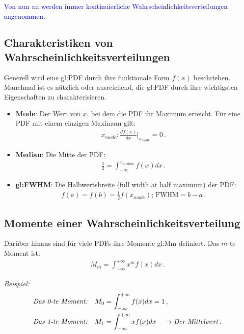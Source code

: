 \begin{center}
\textcolor{blue}{Von nun an werden immer kontinuierliche Wahrscheinlichkeitsverteilungen angenommen.}
\end{center}


\subsection{Charakteristiken von Wahrscheinlichkeitsverteilungen}
\label{subsec:vl4-5}

Generell wird eine \gls{gl:PDF} durch ihre funktionale Form $f ( x )$ beschrieben. Manchmal ist es n\"utzlich oder ausreichend, die \gls{gl:PDF} durch ihre wichtigsten Eigenschaften zu charakterisieren.
\begin{itemize}
    \setlength\itemsep{0em}
        \item \textbf{Mode}: Der Wert von $x$, bei dem die PDF ihr Maximum erreicht. F\"ur eine PDF mit einem einzigen Maximum gilt: 
        \begin{align}
        x_{mode}: \frac{d f ( x )}{dx} \bigg|_{x_{mode}} = 0\,.
        \label{eq:vl4-17}
        \end{align}
        \item \textbf{Median}: Die Mitte der PDF:
        \begin{align}
        \frac{1}{2} = \int_{-\infty}^{x_{median}} f ( x ) dx\,.
        \label{eq:vl4-18}
        \end{align}
        \item \textbf{\gls{gl:FWHM}}: Die Halbwertsbreite (full width at half maximum) der PDF:
        \begin{align}
        f ( a ) = f ( b ) = \frac{1}{2} f ( x_{mode} ) \text{; FWHM} = b - a\,.
        \label{eq:vl4-19}
        \end{align}
\end{itemize}


\subsection{Momente einer Wahrscheinlichkeitsverteilung}
\label{subsec:vl4-6}

Dar\"uber hinaus sind f\"ur viele PDFs ihre Momente \gls{gl:Mm} definiert. Das $m$-te Moment ist:
\begin{align}
M_m = \int_{-\infty}^{+\infty} x^m f (x) dx\,.
\label{eq:vl4-20}
\end{align}

\textit{Beispiel:}
\begin{align}
\begin{split}
\text{\textit{Das 0-te Moment:}}  & \quad M_0 = \int_{-\infty}^{+\infty} f ( x ) dx = 1\,,\\
\text{\textit{Das 1-te Moment:}}  & \quad M_1 = \int_{-\infty}^{+\infty} x f ( x ) dx \quad \rightarrow \text{\textit{Der Mittelwert}}\,.
\end{split}
\label{eq:vl4-21}
\end{align}

